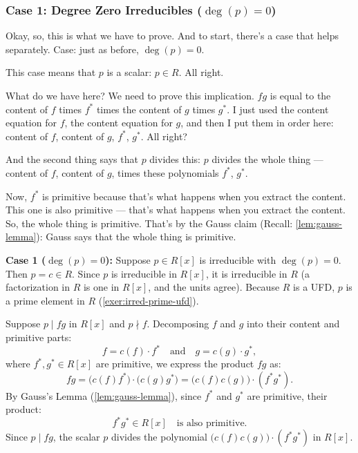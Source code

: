 \begin{proofWrapper}
\subsubsection{Case 1: Degree Zero Irreducibles (\texorpdfstring{$\deg(p) = 0$}{deg(p) = 0})}

\begin{speech}[00:33:17 - 00:34:58]
Okay, so, this is what we have to prove. And to start, there's a case that helps separately. Case:  just as before, $\deg(p) = 0$. 

This case means that $p$ is a scalar: $p \in R$.  All right.

What do we have here? We need to prove this implication. $fg$ is equal to the content of $f$ times $f^*$ times the content of $g$ times $g^*$.  I just used the content equation for $f$, the content equation for $g$, and then I put them in order here: content of $f$, content of $g$, $f^*$, $g^*$.  All right?

And the second thing says that $p$ divides this: $p$ divides the whole thing  --- content of $f$, content of $g$, times these polynomials $f^*$, $g^*$.

Now, $f^*$ is primitive because that's what happens when you extract the content.  This one is also primitive  --- that's what happens when you extract the content. So, the whole thing is primitive.  That's by the Gauss claim (Recall: \cref{lem:gauss-lemma}): Gauss says that the whole thing is primitive. 
\end{speech}

\begin{content}
\textbf{Case 1 ($\deg(p) = 0$):}
Suppose $p \in R[x]$ is irreducible with $\deg(p) = 0$. Then $p = c \in R$.
Since $p$ is irreducible in $R[x]$, it is irreducible in $R$ (a factorization in $R$ is one in $R[x]$, and the units agree). Because $R$ is a UFD, $p$ is a prime element in $R$ (\cref{exer:irred-prime-ufd}).

Suppose $p \mid fg$ in $R[x]$ and $p \nmid f$.
Decomposing $f$ and $g$ into their content and primitive parts:
\[
f = c(f) \cdot f^* \quad \text{and} \quad g = c(g) \cdot g^*,
\]
where $f^*, g^* \in R[x]$ are primitive, we express the product $fg$ as:
\[
fg = \bigl(c(f) f^*\bigr) \cdot \bigl(c(g) g^*\bigr) = \bigl(c(f) c(g)\bigr) \cdot (f^* g^*).
\]
By Gauss's Lemma (\cref{lem:gauss-lemma}), since $f^*$ and $g^*$ are primitive, their product:
\[
f^* g^* \in R[x] \quad \text{is also primitive}.
\]
Since $p \mid fg$, the scalar $p$ divides the polynomial $\bigl(c(f) c(g)\bigr) \cdot (f^* g^*)$ in $R[x]$.
\end{content}


\end{proofWrapper}
